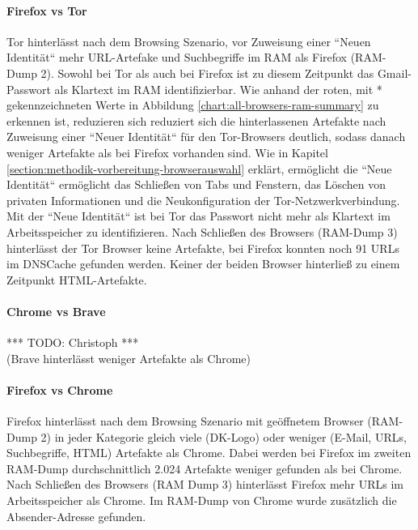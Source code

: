 \paragraph*{Firefox vs Tor}
Tor hinterlässt nach dem Browsing Szenario, vor Zuweisung einer ``Neuen Identität`` mehr URL-Artefake und Suchbegriffe im RAM als Firefox (RAM-Dump 2). 
Sowohl bei Tor als auch bei Firefox ist zu diesem Zeitpunkt das Gmail-Passwort als Klartext im RAM identifizierbar.
Wie anhand der roten, mit * gekennzeichneten Werte in Abbildung \ref{chart:all-browsers-ram-summary} zu erkennen ist, 
reduzieren sich reduziert sich die hinterlassenen Artefakte nach Zuweisung einer ``Neuer Identität`` für den Tor-Browsers deutlich, sodass danach weniger Artefakte als bei Firefox vorhanden sind.
Wie in Kapitel \ref{section:methodik-vorbereitung-browserauswahl} erklärt, ermöglicht die ``Neue Identität`` ermöglicht das Schließen von Tabs und Fenstern, das Löschen von privaten Informationen und die Neukonfiguration der Tor-Netzwerkverbindung.
Mit der ``Neue Identität`` ist bei Tor das Passwort nicht mehr als Klartext im Arbeitsspeicher zu identifizieren.
Nach Schließen des Browsers (RAM-Dump 3) hinterlässt der Tor Browser keine Artefakte, bei Firefox konnten noch 91 URLs im DNSCache gefunden werden. 
Keiner der beiden Browser hinterließ zu einem Zeitpunkt HTML-Artefakte.

\paragraph*{Chrome vs Brave}
*** TODO: Christoph ***\\
(Brave hinterlässt weniger Artefakte als Chrome)

\paragraph*{Firefox vs Chrome}
Firefox hinterlässt nach dem Browsing Szenario mit geöffnetem Browser (RAM-Dump 2) in jeder Kategorie gleich viele (DK-Logo) oder weniger (E-Mail, URLs, Suchbegriffe, HTML) Artefakte als Chrome.
Dabei werden bei Firefox im zweiten RAM-Dump durchschnittlich 2.024 Artefakte weniger gefunden als bei Chrome.
Nach Schließen des Browsers (RAM Dump 3) hinterlässt Firefox mehr URLs im Arbeitsspeicher als Chrome. Im RAM-Dump von Chrome wurde zusätzlich die Absender-Adresse gefunden.

